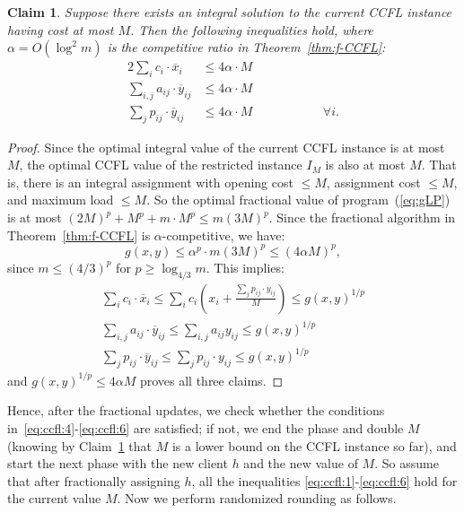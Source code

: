 \documentclass[letterpaper,11pt]{article}
\newtheorem{claim}[thm]{Claim}
\newcommand{\ox}{\ensuremath{\overline{x}}\xspace}
\newcommand{\oy}{\ensuremath{\overline{y}}\xspace}
\def\oy{\overline{y}}
\def\ox{\overline{x}}
\begin{document}
\begin{claim}
  \label{cl:ccfl-LB}
  Suppose there exists an integral solution to the current CCFL instance
  having cost at most $M$. Then the following inequalities hold, where
  $\alpha=O(\log^2m)$ is the competitive ratio in
  Theorem~\ref{thm:f-CCFL}:
  \begin{alignat}{2}
    \sum_i c_i\cdot \ox_i &\le 4\alpha \cdot M & &
    \label{eq:ccfl:4} \\
    \sum_{i,j}a_{ij}\cdot \oy_{ij}  &\le 4\alpha\cdot M & &
    \label{eq:ccfl:5} \\
    \sum_j p_{ij}\cdot \oy_{ij} &\le 4\alpha \cdot M &\qquad\qquad &\forall i.
    \label{eq:ccfl:6}
  \end{alignat}
\end{claim}
\begin{proof}
  Since the optimal integral value of the current CCFL instance is at
  most $M$, the optimal CCFL value of the restricted instance $I_M$ is
  also at most $M$. That is, there is an integral assignment with
  opening cost $\le M$, assignment cost $\le M$, and maximum load $\le
  M$. So the optimal fractional value of program~(\ref{eq:gLP}) is at
  most $(2M)^p+M^p+m\cdot M^p\le m(3M)^p$. Since the fractional
  algorithm in Theorem~\ref{thm:f-CCFL} is $\alpha$-competitive, we
  have:
  \[ g(x,y)\le \alpha^p\cdot m(3M)^p \leq (4\alpha M)^p, \]
  since $m \leq (4/3)^p$ for $p \geq \log_{4/3} m$.
  This implies:
  \begin{gather*}
    \sum_i c_i\cdot \ox_i \le \sum_{i} c_i \left(x_i + \frac{\sum_j
        p_{ij} \cdot y_{ij}}{M}\right) \le g(x,y)^{1/p} \\
    \sum_{i,j}a_{ij}\cdot \oy_{ij} \le \sum_{i,j}a_{ij}y_{ij} \le
    g(x,y)^{1/p}\\
    \sum_j p_{ij} \cdot \oy_{ij} \le \sum_j p_{ij} \cdot y_{ij} \le
    g(x,y)^{1/p}
  \end{gather*}
  and $g(x,y)^{1/p} \leq 4\alpha M$ proves all three claims.
\end{proof}

Hence, after the fractional updates, we check whether the conditions
in~\eqref{eq:ccfl:4}-\eqref{eq:ccfl:6} are satisfied; if not, we end the
phase and double $M$ (knowing by Claim~\ref{cl:ccfl-LB} that $M$ is a
lower bound on the CCFL instance so far), and start the next phase with
the new client $h$ and the new value of $M$. So assume that after
fractionally assigning $h$, all the inequalities
\eqref{eq:ccfl:1}-\eqref{eq:ccfl:6} hold for the current value $M$. Now
we perform randomized rounding as follows.
\end{document}
